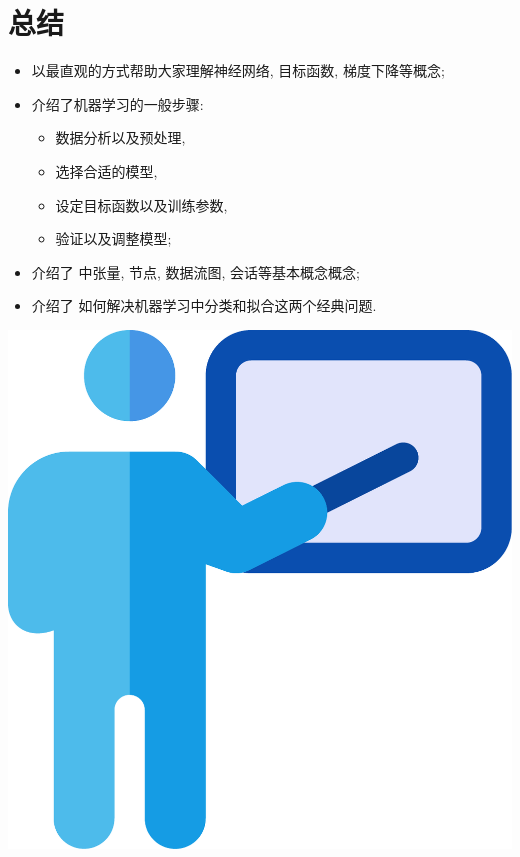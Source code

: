 
\section{总结}
\begin{frame}{\insertsection}
\vfill
\begin{minipage}[m]{0.55\textwidth}
\begin{itemize}
\item 以最直观的方式帮助大家理解神经网络, 目标函数, 梯度下降等概念;
\item 介绍了机器学习的一般步骤:
\begin{itemize}
\item 数据分析以及预处理,
\item 选择合适的模型,
\item 设定目标函数以及训练参数,
\item 验证以及调整模型;
\end{itemize}
\item 介绍了 \tensorflow{} 中张量, 节点, 数据流图, 会话等基本概念概念;
\item 介绍了 \tensorflow{} 如何解决机器学习中分类和拟合这两个经典问题.
\end{itemize}
\end{minipage}%
\hfill%
\begin{minipage}[m]{0.41\textwidth}
\includegraphics[width = \textwidth]{icons/conclusion.pdf}
\end{minipage}
\vfill
\end{frame}